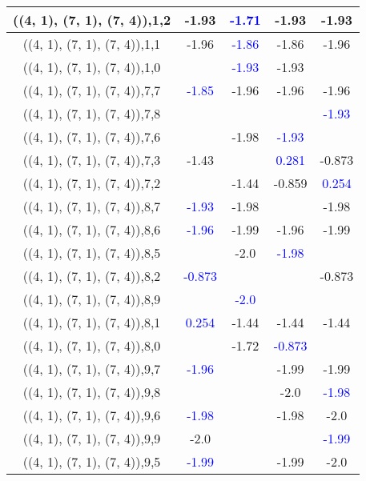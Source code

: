 \documentclass{article}
\begin{document}
\begin{center}
\begin{longtable}{|c|c|c|c|c|}
        	\hline
        	((4, 1), (7, 1), (7, 4)),1,2&-1.93& \textcolor{blue}{-1.71}&-1.93&-1.93\\
        	\hline
        	((4, 1), (7, 1), (7, 4)),1,1&-1.96& \textcolor{blue}{-1.86}&-1.86&-1.96\\
        	\hline
        	((4, 1), (7, 1), (7, 4)),1,0&& \textcolor{blue}{-1.93}&-1.93&\\
        	\hline
        	((4, 1), (7, 1), (7, 4)),7,7& \textcolor{blue}{-1.85}&-1.96&-1.96&-1.96\\
        	\hline
        	((4, 1), (7, 1), (7, 4)),7,8&&&& \textcolor{blue}{-1.93}\\
        	\hline
        	((4, 1), (7, 1), (7, 4)),7,6&&-1.98& \textcolor{blue}{-1.93}&\\
        	\hline
        	((4, 1), (7, 1), (7, 4)),7,3&-1.43&& \textcolor{blue}{0.281}&-0.873\\
        	\hline
        	((4, 1), (7, 1), (7, 4)),7,2&&-1.44&-0.859& \textcolor{blue}{0.254}\\
        	\hline
        	((4, 1), (7, 1), (7, 4)),8,7& \textcolor{blue}{-1.93}&-1.98&&-1.98\\
        	\hline
        	((4, 1), (7, 1), (7, 4)),8,6& \textcolor{blue}{-1.96}&-1.99&-1.96&-1.99\\
        	\hline
        	((4, 1), (7, 1), (7, 4)),8,5&&-2.0& \textcolor{blue}{-1.98}&\\
        	\hline
        	((4, 1), (7, 1), (7, 4)),8,2& \textcolor{blue}{-0.873}&&&-0.873\\
        	\hline
        	((4, 1), (7, 1), (7, 4)),8,9&& \textcolor{blue}{-2.0}&&\\
        	\hline
        	((4, 1), (7, 1), (7, 4)),8,1& \textcolor{blue}{0.254}&-1.44&-1.44&-1.44\\
        	\hline
        	((4, 1), (7, 1), (7, 4)),8,0&&-1.72& \textcolor{blue}{-0.873}&\\
        	\hline
        	((4, 1), (7, 1), (7, 4)),9,7& \textcolor{blue}{-1.96}&&-1.99&-1.99\\
        	\hline
        	((4, 1), (7, 1), (7, 4)),9,8&&&-2.0& \textcolor{blue}{-1.98}\\
        	\hline
        	((4, 1), (7, 1), (7, 4)),9,6& \textcolor{blue}{-1.98}&&-1.98&-2.0\\
        	\hline
        	((4, 1), (7, 1), (7, 4)),9,9&-2.0&&& \textcolor{blue}{-1.99}\\
        	\hline
        	((4, 1), (7, 1), (7, 4)),9,5& \textcolor{blue}{-1.99}&&-1.99&-2.0\\

\end{longtable}
\end{center}
\end{document}
